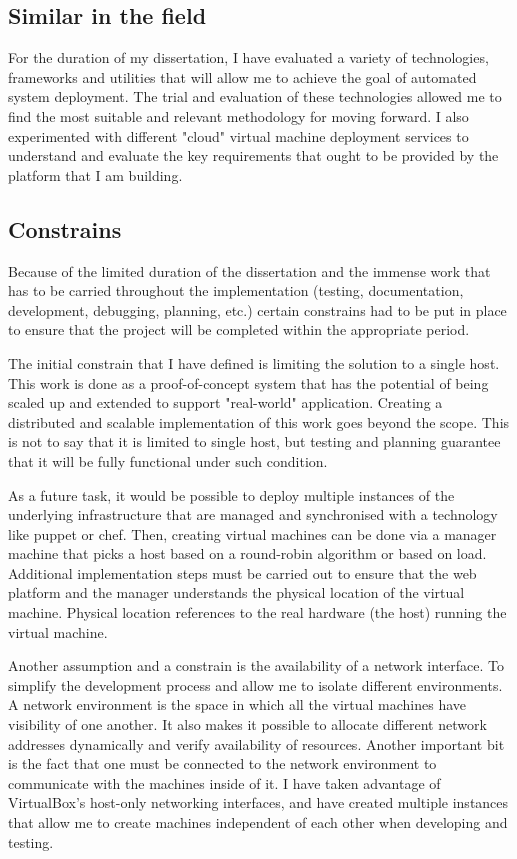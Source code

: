 \documentclass{article}
\begin{document}
\subsection{Similar in the field}
For the duration of my dissertation, I have evaluated a variety of technologies, frameworks and utilities that will allow me to achieve the goal of automated system deployment. The trial and evaluation of these technologies allowed me to find the most suitable and relevant methodology for moving forward. I also experimented with different "cloud" virtual machine deployment services to understand and evaluate the key requirements that ought to be provided by the platform that I am building.

\subsection{Constrains}
Because of the limited duration of the dissertation and the immense work that has to be carried throughout the implementation (testing, documentation, development, debugging, planning, etc.) certain constrains had to be put in place to ensure that the project will be completed within the appropriate period.

The initial constrain that I have defined is limiting the solution to a single host. This work is done as a proof-of-concept system that has the potential of being scaled up and extended to support "real-world" application.
Creating a distributed and scalable implementation of this work goes beyond the scope. This is not to say that it is limited to single host, but testing and planning guarantee that it will be fully functional under such condition.

As a future task, it would be possible to deploy multiple instances of the underlying infrastructure that are managed and synchronised with a technology like puppet or chef. Then, creating virtual machines can be done via a manager machine that picks a host based on a round-robin algorithm or based on load. Additional implementation steps must be carried out to ensure that the web platform and the manager understands the physical location of the virtual machine. Physical location references to the real hardware (the host) running the virtual machine.

Another assumption and a constrain is the availability of a network interface. To simplify the development process and allow me to isolate different environments. A network environment is the space in which all the virtual machines have visibility of one another. It also makes it possible to allocate different network addresses dynamically and verify availability of resources. Another important bit is the fact that one must be connected to the network environment to communicate with the machines inside of it. I have taken advantage of VirtualBox's host-only networking interfaces, and have created multiple instances that allow me to create machines independent of each other when developing and testing.
\end{document}
